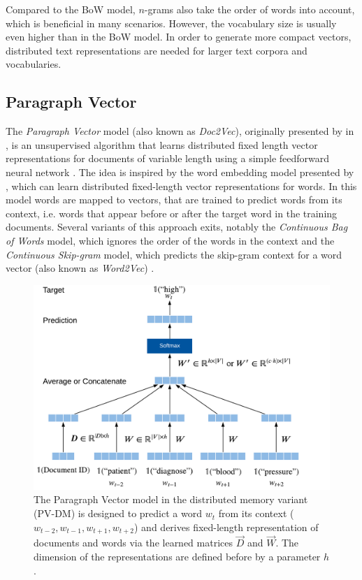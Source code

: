 Compared to the BoW model, $n$-grams also take the order of words into account, which is beneficial in many scenarios.
However, the vocabulary size is usually even higher than in the BoW model.
In order to generate more compact vectors, distributed text representations are needed for larger text corpora and vocabularies.

\subsection{Paragraph Vector}

The \textit{Paragraph Vector} model (also known as \textit{Doc2Vec}), originally presented by \citeauthor{DBLP:conf/icml/LeM14} in \citeyear{DBLP:conf/icml/LeM14}, is an unsupervised algorithm that learns distributed fixed length vector representations for documents of variable length using a simple feedforward neural network \cite{DBLP:conf/icml/LeM14}.
The idea is inspired by the word embedding model presented by \citeauthor{DBLP:journals/jmlr/BengioDVJ03} \cite{DBLP:journals/jmlr/BengioDVJ03}, which can learn distributed fixed-length vector representations for words.
In this model words are mapped to vectors, that are trained to predict words from its context, i.e. words that appear before or after the target word in the training documents.
Several variants of this approach exits, notably the \textit{Continuous Bag of Words} model, which ignores the order of the words in the context and the \textit{Continuous Skip-gram} model, which predicts the skip-gram context for a word vector (also known as \textit{Word2Vec}) \cite{DBLP:journals/corr/abs-1301-3781}.

\begin{figure}[!htbp]
	\centering
	\includegraphics[width=\textwidth]{figures/paragraph-vector}
	\caption[Paragraph Vector model]{The Paragraph Vector model in the distributed memory variant (PV-DM) is designed to predict a word $w_t$ from its context ($w_{t-2}, w_{t-1}, w_{t+1}, w_{t+2}$) and derives fixed-length representation of documents and words via the learned matrices $\vec{D}$ and $\vec{W}$. The dimension of the representations are defined before by a parameter $h$.}
	\label{fig:paragraph-vector}
\end{figure}

